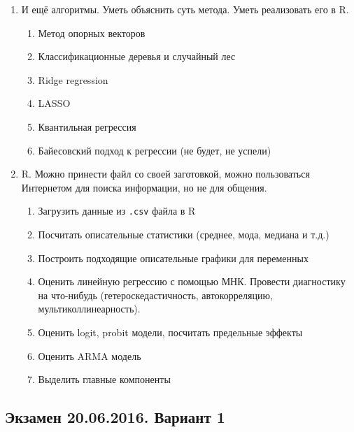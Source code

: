 \documentclass[12pt, a4paper]{article}
\begin{document}
\begin{enumerate}
\item И ещё алгоритмы. Уметь объяснить суть метода. Уметь реализовать его в R. %
\begin{enumerate}
\item Метод опорных векторов
\item Классификационные деревья и случайный лес
\item Ridge regression
\item LASSO
\item Квантильная регрессия
\item Байесовский подход к регрессии (не будет, не успели)
\end{enumerate}


\item R. Можно принести файл со своей заготовкой, можно пользоваться Интернетом для поиска информации, но не для общения.
\begin{enumerate}
\item Загрузить данные из \verb|.csv| файла в R
\item Посчитать описательные статистики (среднее, мода, медиана и т.д.)
\item Построить подходящие описательные графики для переменных
\item Оценить линейную регрессию с помощью МНК. Провести диагностику на что-нибудь (гетероскедастичность, автокорреляцию, мультиколлинеарность).
\item Оценить logit, probit модели, посчитать предельные эффекты
\item Оценить ARMA модель
\item Выделить главные компоненты
\end{enumerate}


\end{enumerate}


\subsection{Экзамен 20.06.2016. Вариант 1}
\end{document}
